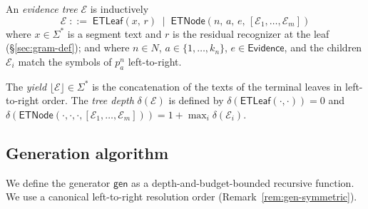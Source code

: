 \begin{definition}
\label{def:gen-evtree}
An \emph{evidence tree} \(\mathcal{E}\) is inductively
\[
  \mathcal{E} \;::=\;
  \mathsf{ETLeaf}(x,\, r)
  \;\mid\;
  \mathsf{ETNode}(n,\, a,\, e,\, [\mathcal{E}_1, \ldots, \mathcal{E}_m])
\]
where \(x \in \Sigma^\ast\) is a segment text and \(r\) is the residual
recognizer at the leaf (\S\ref{sec:gram-def}); and where \(n \in N\),
\(a \in \{1,\ldots,k_n\}\), \(e \in \mathsf{Evidence}\), and the children
\(\mathcal{E}_i\) match the symbols of \(p_a^n\) left-to-right.
\end{definition}

\begin{definition}
\label{def:gen-yield-depth}
The \emph{yield} \(\lfloor \mathcal{E} \rfloor \in \Sigma^\ast\) is the
concatenation of the texts of the terminal leaves in left-to-right order.
The \emph{tree depth} \(\delta(\mathcal{E})\) is defined by
\(\delta(\mathsf{ETLeaf}(\cdot,\cdot)) = 0\) and
\(\delta(\mathsf{ETNode}(\cdot,\cdot,\cdot,[\mathcal{E}_1,\ldots,\mathcal{E}_m])) =
1 + \max_i \delta(\mathcal{E}_i)\).
\end{definition}

\subsection{Generation algorithm}
\label{sec:gen-algorithm}

We define the generator \(\mathsf{gen}\) as a depth-and-budget-bounded
recursive function. We use a canonical left-to-right resolution order
(Remark~\ref{rem:gen-symmetric}).

